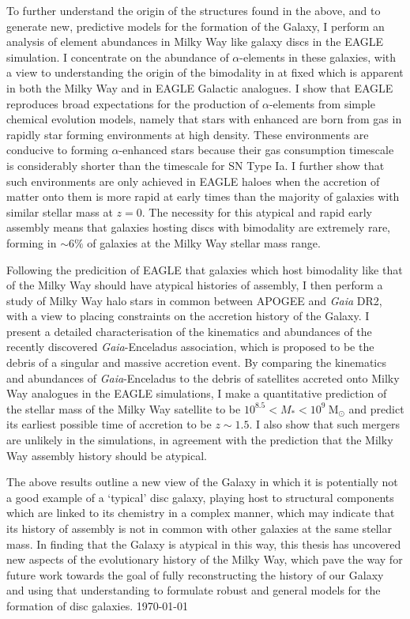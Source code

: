 To further understand the origin of the structures found in the above, and to generate new, predictive models for the formation of the Galaxy, I perform an analysis of element abundances in Milky Way like galaxy discs in the EAGLE simulation. I concentrate on the abundance of $\alpha$-elements in these galaxies, with a view to understanding the origin of the bimodality in \afe{} at fixed \feh{} which is apparent in both the Milky Way and in EAGLE Galactic analogues. I show that EAGLE reproduces broad expectations for the production of $\alpha$-elements from simple chemical evolution models, namely that stars with enhanced \afe{} are born from gas in rapidly star forming environments at high density. These environments are conducive to forming $\alpha$-enhanced stars because their gas consumption timescale is considerably shorter than the timescale for SN Type Ia. I further show that such environments are only achieved in EAGLE haloes when the accretion of matter onto them is more rapid at early times than the majority of galaxies with similar stellar mass at $z=0$. The necessity for this atypical and rapid early assembly means that galaxies hosting discs with \afe{} bimodality are extremely rare, forming in $\sim 6\%$ of galaxies at the Milky Way stellar mass range.

Following the predicition of EAGLE that galaxies which host \afe{} bimodality like that of the Milky Way should have atypical histories of assembly, I then perform a study of Milky Way halo stars in common between APOGEE and \emph{Gaia} DR2, with a view to placing constraints on the accretion history of the Galaxy. I present a detailed characterisation of the kinematics and abundances of the recently discovered \emph{Gaia}-Enceladus association, which is proposed to be the debris of a singular and massive accretion event. By comparing the kinematics and abundances of \emph{Gaia}-Enceladus to the debris of satellites accreted onto Milky Way analogues in the EAGLE simulations, I make a quantitative prediction of the stellar mass of the Milky Way satellite to be $10^{8.5} < M_{*} < 10^{9}\ \mathrm{M_{\odot}}$ and predict its earliest possible time of accretion to be $z\sim1.5$. I also show that such mergers are unlikely in the simulations, in agreement with the prediction that the Milky Way assembly history should be atypical.

The above results outline a new view of the Galaxy in which it is potentially not a good example of a `typical' disc galaxy, playing host to structural components which are linked to its chemistry in a complex manner, which may indicate that its history of assembly is not in common with other galaxies at the same stellar mass. In finding that the Galaxy is atypical in this way, this thesis has uncovered new aspects of the evolutionary history of the Milky Way, which pave the way for future work towards the goal of fully reconstructing the history of our Galaxy and using that understanding to formulate robust and general models for the formation of disc galaxies. 
\vfill
{\sc \AuthorName \hfill\today}